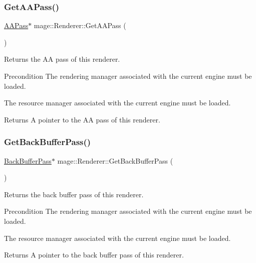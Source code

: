 \subsubsection{\texorpdfstring{Get\+A\+A\+Pass()}{GetAAPass()}}
{\footnotesize\ttfamily \hyperlink{classmage_1_1_a_a_pass}{A\+A\+Pass}$\ast$ mage\+::\+Renderer\+::\+Get\+A\+A\+Pass (\begin{DoxyParamCaption}{ }\end{DoxyParamCaption})}

Returns the AA pass of this renderer.

\begin{DoxyPrecond}{Precondition}
The rendering manager associated with the current engine must be loaded. 

The resource manager associated with the current engine must be loaded. 
\end{DoxyPrecond}
\begin{DoxyReturn}{Returns}
A pointer to the AA pass of this renderer. 
\end{DoxyReturn}
\hypertarget{classmage_1_1_renderer_a94e08d62790b3bfb1a12ae2ae657c5c2}{}\label{classmage_1_1_renderer_a94e08d62790b3bfb1a12ae2ae657c5c2} 
\subsubsection{\texorpdfstring{Get\+Back\+Buffer\+Pass()}{GetBackBufferPass()}}
{\footnotesize\ttfamily \hyperlink{classmage_1_1_back_buffer_pass}{Back\+Buffer\+Pass}$\ast$ mage\+::\+Renderer\+::\+Get\+Back\+Buffer\+Pass (\begin{DoxyParamCaption}{ }\end{DoxyParamCaption})}

Returns the back buffer pass of this renderer.

\begin{DoxyPrecond}{Precondition}
The rendering manager associated with the current engine must be loaded. 

The resource manager associated with the current engine must be loaded. 
\end{DoxyPrecond}
\begin{DoxyReturn}{Returns}
A pointer to the back buffer pass of this renderer. 
\end{DoxyReturn}
\hypertarget{classmage_1_1_renderer_a770922853ea48d3f01be5518df8aadb5}{}\label{classmage_1_1_renderer_a770922853ea48d3f01be5518df8aadb5} 
